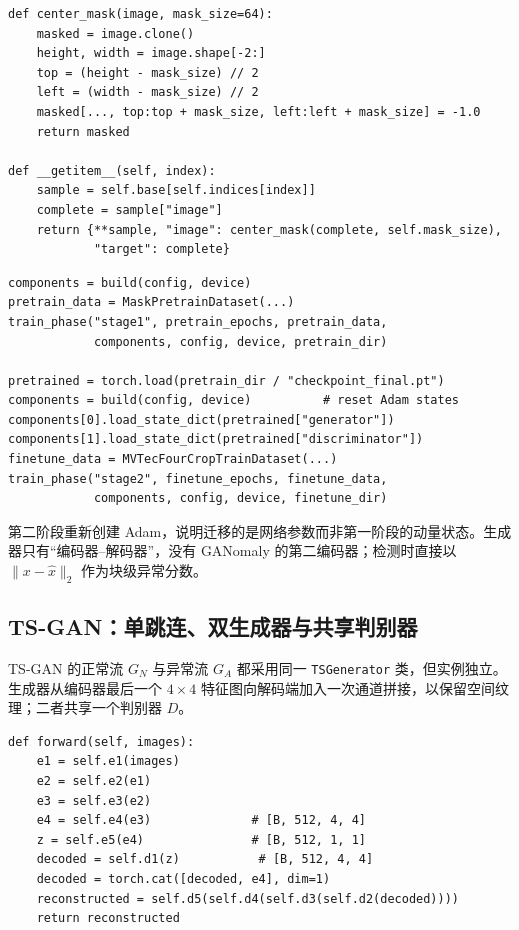 \documentclass[UTF8,12pt]{ctexart}
\begin{document}
\begin{lstlisting}[style=pythonstyle,caption={Mask Encoders 的中心遮挡样本},label={lst:mask-data}]
def center_mask(image, mask_size=64):
    masked = image.clone()
    height, width = image.shape[-2:]
    top = (height - mask_size) // 2
    left = (width - mask_size) // 2
    masked[..., top:top + mask_size, left:left + mask_size] = -1.0
    return masked

def __getitem__(self, index):
    sample = self.base[self.indices[index]]
    complete = sample["image"]
    return {**sample, "image": center_mask(complete, self.mask_size),
            "target": complete}
\end{lstlisting}

\begin{lstlisting}[style=pythonstyle,caption={Mask Encoders 的两阶段权重衔接},label={lst:mask-stages}]
components = build(config, device)
pretrain_data = MaskPretrainDataset(...)
train_phase("stage1", pretrain_epochs, pretrain_data,
            components, config, device, pretrain_dir)

pretrained = torch.load(pretrain_dir / "checkpoint_final.pt")
components = build(config, device)          # reset Adam states
components[0].load_state_dict(pretrained["generator"])
components[1].load_state_dict(pretrained["discriminator"])
finetune_data = MVTecFourCropTrainDataset(...)
train_phase("stage2", finetune_epochs, finetune_data,
            components, config, device, finetune_dir)
\end{lstlisting}

第二阶段重新创建 Adam，说明迁移的是网络参数而非第一阶段的动量状态。生成器只有“编码器--解码器”，没有 GANomaly 的第二编码器；检测时直接以 $\lVert x-\hat{x}\rVert_2$ 作为块级异常分数。

\subsection{TS-GAN：单跳连、双生成器与共享判别器}

TS-GAN 的正常流 $G_N$ 与异常流 $G_A$ 都采用同一 \texttt{TSGenerator} 类，但实例独立。生成器从编码器最后一个 $4\times4$ 特征图向解码端加入一次通道拼接，以保留空间纹理；二者共享一个判别器 $D$。

\begin{lstlisting}[style=pythonstyle,caption={TS-GAN 单次跳跃连接的前向传播},label={lst:ts-forward}]
def forward(self, images):
    e1 = self.e1(images)
    e2 = self.e2(e1)
    e3 = self.e3(e2)
    e4 = self.e4(e3)              # [B, 512, 4, 4]
    z = self.e5(e4)               # [B, 512, 1, 1]
    decoded = self.d1(z)           # [B, 512, 4, 4]
    decoded = torch.cat([decoded, e4], dim=1)
    reconstructed = self.d5(self.d4(self.d3(self.d2(decoded))))
    return reconstructed
\end{lstlisting}
\end{document}
